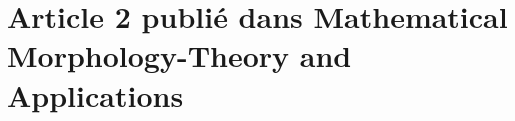 \documentclass[\main/main.tex]{subfiles}
\begin{document}
\section{Article 2 publié dans Mathematical Morphology\hyp{}Theory and Applications}


\end{document}
